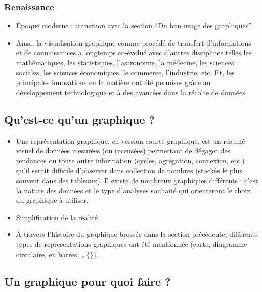 \documentclass[]{article}
\providecommand{\tightlist}{%
  \setlength{\itemsep}{0pt}\setlength{\parskip}{0pt}}
\begin{document}
\hypertarget{renaissance}{%
\subsubsection{Renaissance}\label{renaissance}}

\begin{itemize}
\tightlist
\item
  Époque moderne : transition avec la section ``Du bon usage des graphiques''
\item
  Ainsi, la visualisation graphique comme procédé de transfert d'informations et de connaissances a longtemps co-évolué avec d'autres disciplines telles les mathématiques, les statistiques, l'astronomie, la médecine, les sciences sociales, les sciences économiques, le commerce, l'industrie, etc. Et, les principales innovations en la matière ont été permises grâce au développement technologique et à des avancées dans la récolte de données.
\end{itemize}

\hypertarget{quest-ce-quun-graphique}{%
\subsection{Qu'est-ce qu'un graphique ?}\label{quest-ce-quun-graphique}}

\begin{itemize}
\tightlist
\item
  Une représentation graphique, en version courte graphique, est un résumé visuel de données mesurées (ou recensées) permettant de dégager des tendances ou toute autre information (cycles, agrégation, connexion, etc.) qu'il serait difficile d'observer dans collection de nombres (stockés le plus souvent dans des tableaux). Il existe de nombreux graphiques différents : c'est la nature des données et le type d'analyses souhaité qui orienteront le choix du graphique à utiliser.
\item
  Simplification de la réalité
\item
  À travers l'histoire du graphique brossée dans la section précédente, différents types de representations graphiques ont été mentionnée (carte, diagramme circulaire, en barres, \ldots\{\}).
\end{itemize}

\hypertarget{un-graphique-pour-quoi-faire}{%
\subsection{Un graphique pour quoi faire ?}\label{un-graphique-pour-quoi-faire}}
\end{document}
